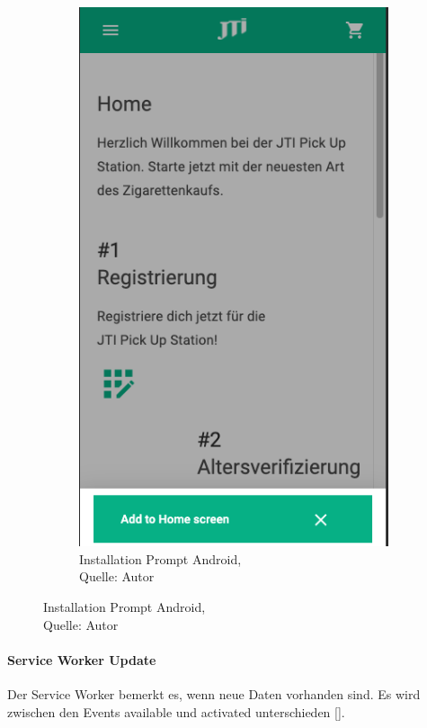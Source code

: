 \begin{figure}[H]
\begin{subfigure}[b]{0.5\textwidth}
		\label{img: promptIOS}
	\end{subfigure}
	\hfill
	\begin{subfigure}[b]{0.5\textwidth}
		\includegraphics[scale=0.5]{images/promptAndroid.png}
		\caption[Installation Prompt Android]{Installation Prompt Android,\\ Quelle: Autor}
		\label{img: promptAndroid}
	\end{subfigure}
\end{figure} 
\paragraph{Service Worker Update}
Der Service Worker bemerkt es, wenn neue Daten vorhanden sind. Es wird zwischen den Events available und activated unterschieden [\cite{swupdate}].
